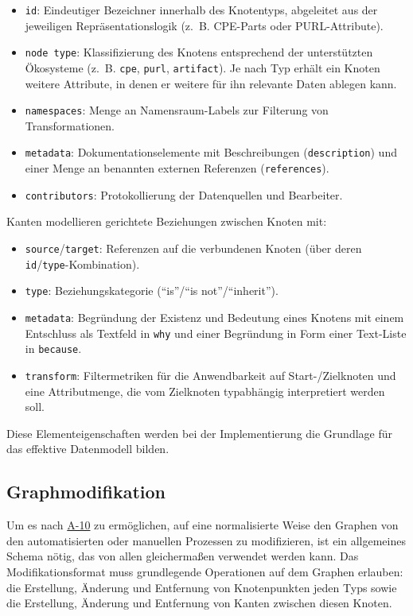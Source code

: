 \begin{itemize}
    \itemsep0em
    \item \texttt{id}: Eindeutiger Bezeichner innerhalb des Knotentyps, abgeleitet aus der jeweiligen Repräsentationslogik (z.\ B. CPE-Parts oder PURL-Attribute).
    \item \texttt{node type}: Klassifizierung des Knotens entsprechend der unterstützten Ökosysteme (z.\ B. \texttt{cpe}, \texttt{purl}, \texttt{artifact}).
    Je nach Typ erhält ein Knoten weitere Attribute, in denen er weitere für ihn relevante Daten ablegen kann.
    \item \texttt{namespaces}: Menge an Namensraum-Labels zur Filterung von Transformationen.
    \item \texttt{metadata}: Dokumentationselemente mit Beschreibungen (\texttt{description}) und einer Menge an benannten externen Referenzen (\texttt{references}).
    \item \texttt{contributors}: Protokollierung der Datenquellen und Bearbeiter.
\end{itemize}

Kanten modellieren gerichtete Beziehungen zwischen Knoten mit:

\begin{itemize}
    \itemsep0em
    \item \texttt{source}/\texttt{target}: Referenzen auf die verbundenen Knoten (über deren \texttt{id}/\texttt{type}-Kombination).
    \item \texttt{type}: Beziehungskategorie (\enquote{is}/\enquote{is not}/\enquote{inherit}).
    \item \texttt{metadata}: Begründung der Existenz und Bedeutung eines Knotens mit einem Entschluss als Textfeld in \texttt{why} und einer Begründung in Form einer Text-Liste in \texttt{because}.
    \item \texttt{transform}: Filtermetriken für die Anwendbarkeit auf Start-/Zielknoten und eine Attributmenge, die vom Zielknoten typabhängig interpretiert werden soll.
\end{itemize}

Diese Elementeigenschaften werden bei der Implementierung die Grundlage für das effektive Datenmodell bilden.

\subsection{Graphmodifikation}\label{subsec:model-graph-modification}

Um es nach \hyperref[subsec:req-manual-format-modification]{A-10} zu ermöglichen, auf eine normalisierte Weise den Graphen von den automatisierten oder manuellen Prozessen zu modifizieren, ist ein allgemeines Schema nötig, das von allen gleichermaßen verwendet werden kann.
Das Modifikationsformat muss grundlegende Operationen auf dem Graphen erlauben: die Erstellung, Änderung und Entfernung von Knotenpunkten jeden Typs sowie die Erstellung, Änderung und Entfernung von Kanten zwischen diesen Knoten.

